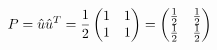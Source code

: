 \documentclass[preview]{standalone}
\begin{document}
\begin{align*}
\special{dvisvgm:raw <g id='unique000'>}P=\hat u\hat u^T=\dfrac{1}{2}\begin{pmatrix}1&1\\1&1\end{pmatrix}=\begin{pmatrix}\frac{1}{2}&\frac{1}{2}\\\frac{1}{2}&\frac{1}{2}\end{pmatrix}\special{dvisvgm:raw </g>}
\end{align*}
\end{document}
